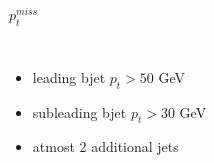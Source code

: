 \documentclass[10pt,xcolor=dvipsnames]{beamer}
\begin{document}
\begin{frame}[fragile]{$p^{miss}_t$ }
\begin{columns}
\begin{itemize}
      \item {leading bjet $p_t > 50 $ GeV}
      \item {subleading bjet $p_t > 30 $ GeV}
      \item {atmost 2 additional jets}
    \end{itemize}
  \end{columns}
\end{frame}

\end{document}
